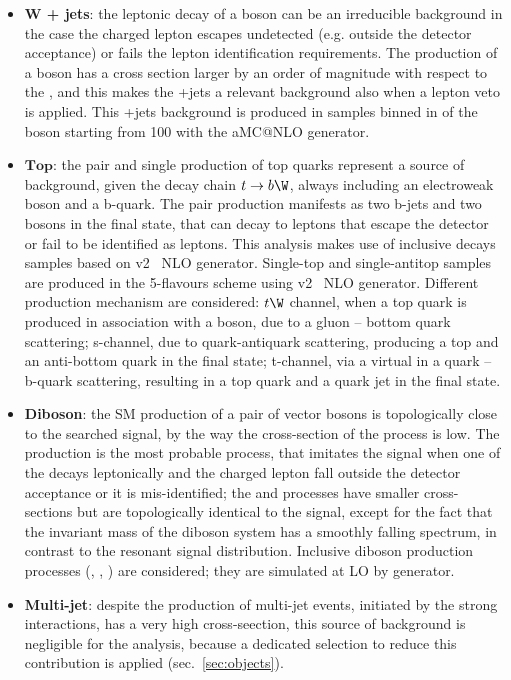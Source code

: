 \begin{itemize}
  \item {\bf W + jets}: the leptonic decay of a \W boson can be an irreducible background in the case the charged lepton escapes undetected (e.g. outside the detector acceptance) or fails the lepton identification requirements. The production of a \W boson has a cross section larger by an order of magnitude with respect to the \Z, and this makes the \W+jets a relevant background also when a lepton veto is applied. This \W+jets background is produced in samples binned in \pt of the \W boson starting from 100 \GeV with the {\sc aMC@NLO} generator.%
  \item $\mathbf{Top}$: the pair and single production of top quarks represent a source of background, given the decay chain $t \rightarrow b \W$, always including an electroweak \W boson and a b-quark. The \ttbar pair production manifests as two b-jets and two \W bosons in the final state, that can decay to leptons that escape the detector or fail to be identified as leptons. This analysis makes use of \ttbar inclusive decays samples based on \POWHEG v2~\cite{bib:POWHEGst} NLO generator. Single-top and single-antitop samples are produced in the 5-flavours scheme using \POWHEG v2~\cite{bib:POWHEGtt} NLO generator. Different production mechanism are considered: $t \W$ channel, when a top quark is produced in association with a \W boson, due to a gluon -- bottom quark scattering; s-channel, due to quark-antiquark scattering, producing a top and an anti-bottom quark in the final state; t-channel, via a virtual \W in a quark -- b-quark scattering, resulting in a top quark and a quark jet in the final state.
  \item {\bf Diboson}: the SM production of a pair of vector bosons is topologically close to the searched signal, by the way the cross-section of the process is low. The \W\W production is the most probable process, that imitates the signal when one of the \W decays leptonically and the charged lepton fall outside the detector acceptance or it is mis-identified; the \W\Z and \Z\Z processes have smaller cross-sections but are topologically identical to the signal, except for the fact that the invariant mass of the diboson system has a smoothly falling spectrum, in contrast to the resonant signal distribution. Inclusive diboson production processes (\W\W, \W\Z, \Z\Z) are considered; they are simulated at LO by \PYTHIA generator.
  \item {\bf Multi-jet}: despite the production of multi-jet events, initiated by the strong interactions, has a very high cross-seection, this source of background is negligible for the analysis, because a dedicated selection to reduce this contribution is applied (sec.~\ref{sec:objects}).
\end{itemize}




